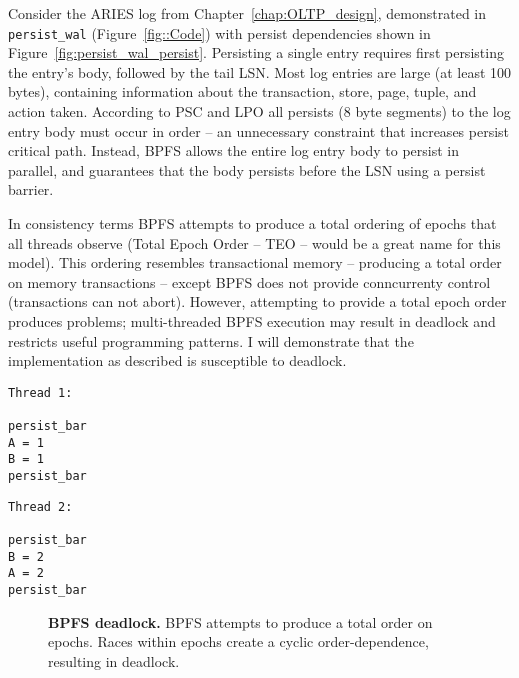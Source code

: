 

Consider the ARIES log from Chapter~\ref{chap:OLTP_design}, demonstrated in \texttt{persist\_wal} (Figure~\ref{fig::Code}) with persist dependencies shown in Figure~\ref{fig:persist_wal_persist}.
Persisting a single entry requires first persisting the entry's body, followed by the tail LSN.
Most log entries are large (at least 100 bytes), containing information about the transaction, store, page, tuple, and action taken.
According to PSC and LPO all persists (8 byte segments) to the log entry body must occur in order -- an unnecessary constraint that increases persist critical path.
Instead, BPFS allows the entire log entry body to persist in parallel, and guarantees that the body persists before the LSN using a persist barrier.

In consistency terms BPFS attempts to produce a total ordering of epochs that all threads observe (Total Epoch Order -- TEO -- would be a great name for this model).
This ordering resembles transactional memory -- producing a total order on memory transactions -- except BPFS does not provide conncurrenty control (transactions can not abort).
However, attempting to provide a total epoch order produces problems; multi-threaded BPFS execution may result in deadlock and restricts useful programming patterns.
I will demonstrate that the implementation as described is susceptible to deadlock.

{
\singlespacing
\newsavebox{\ThreadOne}
\begin{lrbox}{\ThreadOne}
  \begin{lstlisting}
Thread 1:

persist_bar
A = 1
B = 1
persist_bar
  \end{lstlisting}
\end{lrbox}

\newsavebox{\ThreadTwo}
\begin{lrbox}{\ThreadTwo}
  \begin{lstlisting}
Thread 2:

persist_bar
B = 2
A = 2
persist_bar
  \end{lstlisting}
\end{lrbox}

\begin{figure}[]
\centering
\subfigure{ \usebox{\ThreadOne} }
\hspace{1 in}
\subfigure{ \usebox{\ThreadTwo} }
\caption{\textbf{BPFS deadlock.} BPFS attempts to produce a total order on epochs.  Races within epochs create a cyclic order-dependence, resulting in deadlock.}
\label{fig:BPFS_deadlock}
\end{figure}
}

